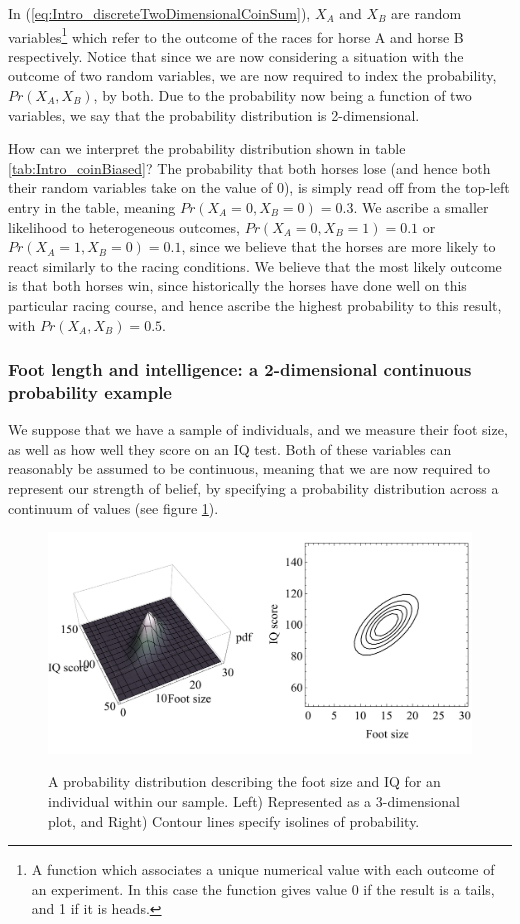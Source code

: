 \documentclass[11pt,fullpage]{book}
\begin{document}
In (\ref{eq:Intro_discreteTwoDimensionalCoinSum}), $X_A$ and $X_B$ are random variables\footnote{A function which associates a unique numerical value with each outcome of an experiment. In this case the function gives value 0 if the result is a tails, and 1 if it is heads.} which refer to the outcome of the races for horse A and horse B respectively. Notice that since we are now considering a situation with the outcome of two random variables, we are now required to index the probability, $Pr(X_A,X_B)$, by both. Due to the probability now being a function of two variables, we say that the probability distribution is 2-dimensional.

How can we interpret the probability distribution shown in table \ref{tab:Intro_coinBiased}? The probability that both horses lose (and hence both their random variables take on the value of 0), is simply read off from the top-left entry in the table, meaning $Pr(X_A=0,X_B=0)=0.3$. We ascribe a smaller likelihood to heterogeneous outcomes, $Pr(X_A=0,X_B=1)=0.1$ or $Pr(X_A=1,X_B=0)=0.1$, since we believe that the horses are more likely to react similarly to the racing conditions. We believe that the most likely outcome is that both horses win, since historically the horses have done well on this particular racing course, and hence ascribe the highest probability to this result, with $Pr(X_A,X_B)=0.5$.

\subsubsection{Foot length and intelligence: a 2-dimensional continuous probability example}
We suppose that we have a sample of individuals, and we measure their foot size, as well as how well they score on an IQ test. Both of these variables can reasonably be assumed to be continuous, meaning that we are now required to represent our strength of belief, by specifying a probability distribution across a continuum of values (see figure \ref{fig:Intro_footSizeIntelligenceTwoDimensionalExample}). 

\begin{figure}
\centering
\scalebox{0.5} 
{\includegraphics{Intro_footSizeIntelligenceTwoDimensionalExample.pdf}}
\caption{A probability distribution describing the foot size and IQ for an individual within our sample. Left) Represented as a 3-dimensional plot, and Right) Contour lines specify isolines of probability.}\label{fig:Intro_footSizeIntelligenceTwoDimensionalExample}
\end{figure}
\end{document}
